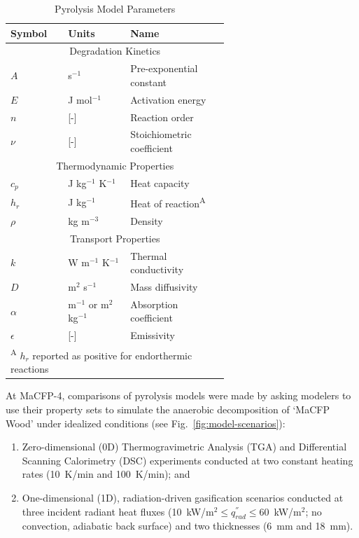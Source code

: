 \documentclass{article}
\begin{document}
\begin{table}[htb]
	\centering
	\caption{ Pyrolysis Model Parameters}
	\label{table:properties}
	\begin{tabular}{p{0.125\linewidth} | p{0.2\linewidth}| p{0.3\linewidth}}
		\hline
		\textbf{Symbol}         & \textbf{Units} & \textbf{Name}\\
		\hline
		\multicolumn{3}{c}{Degradation Kinetics}\\
		\hline
		$A$ &s$^{-1}$   &Pre-exponential constant \\
		$E$ &J mol$^{-1}$ &Activation energy \\
		$n$ &[-]    &Reaction order\\
		$\nu$ &[-]    &Stoichiometric coefficient\\
		\hline
		\multicolumn{3}{c}{Thermodynamic Properties}\\
		\hline
		$c_p$ &J kg$^{-1}$ K$^{-1}$ &Heat capacity\\
		$h_r$ &J kg$^{-1}$    &Heat of reaction\textsuperscript{A}\\
		$\rho$  &kg m$^{-3}$    &Density\\
		\hline
		\multicolumn{3}{c}{Transport Properties}\\
		\hline
		$k$ &W m$^{-1}$ K$^{-1}$  &Thermal conductivity\\
		$D$ &m$^2$ s$^{-1}$   &Mass diffusivity\\
		$\alpha$  &m$^{-1}$ or m$^2$ kg$^{-1}$  &Absorption coefficient\\
		$\epsilon$  &[-]        &Emissivity\\
		\hline
		\multicolumn{3}{l}{\textsuperscript{A} $h_r$ reported as positive for endorthermic reactions}
	\end{tabular}
\end{table}

\pagebreak
At MaCFP-4, comparisons of pyrolysis models were made by asking modelers to use their property sets to simulate the anaerobic decomposition of `MaCFP Wood' under idealized conditions (see Fig.~\ref{fig:model-scenarios}):
\begin{enumerate}
	\item  Zero-dimensional (0D) Thermogravimetric Analysis (TGA) and Differential Scanning Calorimetry (DSC) experiments conducted at two constant heating rates (10~K/min and 100~K/min); and
	\item One-dimensional (1D), radiation-driven gasification scenarios conducted at three incident radiant heat fluxes (10~kW/m$^2 \leq q^{''}_{rad} \leq 60$~kW/m$^2$; no convection, adiabatic back surface) and two thicknesses (6~mm and 18~mm).
\end{enumerate}
\end{document}
